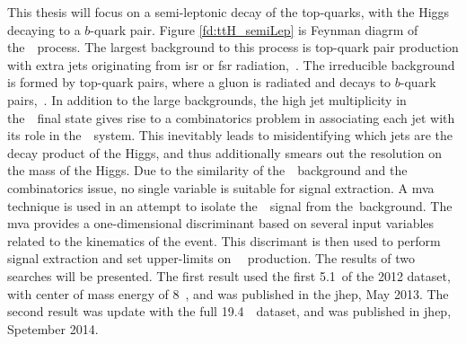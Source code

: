 \par This thesis will focus on a semi-leptonic decay of the top-quarks, with the Higgs decaying to a $b$-quark pair.  Figure \ref{fd:ttH_semiLep} is Feynman diagrm of the~\ttH~process.  The largest background to this process is top-quark pair production with extra jets originating from \acrfull{isr} or \acrfull{fsr} radiation,~\ttjets.  The irreducible background is formed by top-quark pairs, where a gluon is radiated and decays to $b$-quark pairs,~\ttbb.  In addition to the large backgrounds, the high jet multiplicity in the~\ttH~final state gives rise to a combinatorics problem in associating each jet with its role in the~\ttH~system.  This inevitably leads to misidentifying which jets are the decay product of the Higgs, and thus additionally smears out the resolution on the mass of the Higgs.  Due to the similarity of the~\ttbb~background and the combinatorics issue, no single variable is suitable for signal extraction.  A \acrfull{mva} technique is used in an attempt to isolate the~\ttH~signal from the~\ttjets background.  The \acrshort{mva} provides a one-dimensional discriminant based on several input variables related to the kinematics of the event.  This discrimant is then used to perform signal extraction and set upper-limits on~\ttH~ production.  The results of two searches will be presented.  The first result used the first 5.1~\fbinv of the 2012 dataset, with center of mass energy of 8~\TeV, and was published in the \acrfull{jhep}, May 2013.  The second result was update with the full 19.4~~\TeV dataset, and was published in \acrshort{jhep}, Spetember 2014.   

